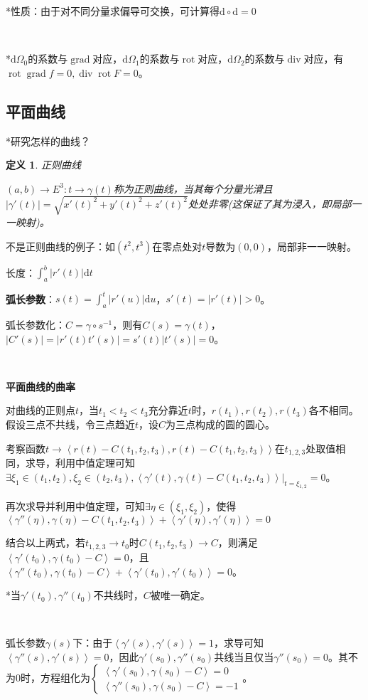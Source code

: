 \documentclass[a4paper,UTF8,fontset=windows]{ctexart}
\DeclareMathOperator{\Div}{div}
\DeclareMathOperator{\grad}{grad}
\DeclareMathOperator{\rot}{rot}
\newtheorem{dfn}[thm]{定义}
\begin{document}
*性质：由于对不同分量求偏导可交换，可计算得$\mathrm{d}\circ\mathrm{d}=0$

\

*$\mathrm{d}\Omega_0$的系数与$\grad$对应，$\mathrm{d}\Omega_1$的系数与$\rot$对应，$\mathrm{d}\Omega_2$的系数与$\Div$对应，有$\rot\grad f=0,\Div\rot F=0$。

\subsection{平面曲线}

*研究怎样的曲线？

\begin{dfn} 正则曲线

$(a,b)\to E^3:t\to\gamma(t)$称为正则曲线，当其每个分量光滑且$|\gamma'(t)|=\sqrt{x'(t)^2+y'(t)^2+z'(t)^2}$处处非零(这保证了其为浸入，即局部一一映射)。
\end{dfn}

不是正则曲线的例子：如$(t^2,t^3)$在零点处对$t$导数为$(0,0)$，局部非一一映射。

长度：$\int_a^b|r'(t)|\mathrm{d}t$

\textbf{弧长参数}：$s(t)=\int_a^t|r'(u)|\mathrm{d}u$，$s'(t)=|r'(t)|>0$。

弧长参数化：$C=\gamma\circ s^{-1}$，则有$C(s)=\gamma(t)$，$|C'(s)|=|r'(t)t'(s)|=s'(t)|t'(s)|=0$。

\

\textbf{平面曲线的曲率}

对曲线的正则点$t$，当$t_1<t_2<t_3$充分靠近$t$时，$r(t_1),r(t_2),r(t_3)$各不相同。假设三点不共线，令三点趋近$t$，设$C$为三点构成的圆的圆心。

考察函数$t\to\left<r(t)-C(t_1,t_2,t_3),r(t)-C(t_1,t_2,t_3)\right>$在$t_{1,2,3}$处取值相同，求导，利用中值定理可知$\exists\xi_1\in(t_1,t_2),\xi_2\in(t_2,t_3),\left<\gamma'(t),\gamma(t)-C(t_1,t_2,t_3)\right>|_{t=\xi_{1,2}}=0$。

再次求导并利用中值定理，可知$\exists\eta\in(\xi_1,\xi_2)$，使得$\left<\gamma''(\eta),\gamma(\eta)-C(t_1,t_2,t_3)\right>+\left<\gamma'(\eta),\gamma'(\eta)\right>=0$

结合以上两式，若$t_{1,2,3}\to t_0$时$C(t_1,t_2,t_3)\to C$，则满足$\left<\gamma'(t_0),\gamma(t_0)-C\right>=0$，且$\left<\gamma''(t_0),\gamma(t_0)-C\right>+\left<\gamma'(t_0),\gamma'(t_0)\right>=0$。

*当$\gamma'(t_0),\gamma''(t_0)$不共线时，$C$被唯一确定。

\

弧长参数$\gamma(s)$下：由于$\left<\gamma'(s),\gamma'(s)\right>=1$，求导可知$\left<\gamma''(s),\gamma'(s)\right>=0$，因此$\gamma'(s_0),\gamma''(s_0)$共线当且仅当$\gamma''(s_0)=0$。其不为0时，方程组化为$\begin{cases}\left<\gamma'(s_0),\gamma(s_0)-C\right>=0\\\left<\gamma''(s_0),\gamma(s_0)-C\right>=-1\end{cases}$。
\end{document}
